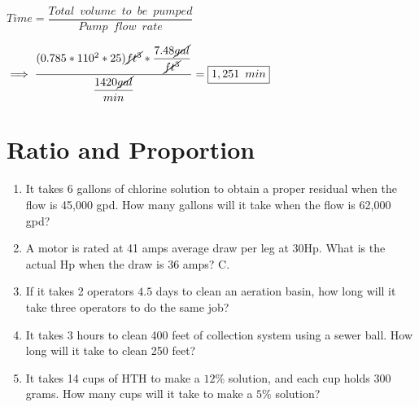 \documentclass{article}
\begin{document}
\vspace{0.3cm}

$Time=\dfrac{Total \enspace volume \enspace to \enspace be \enspace pumped}{Pump \enspace flow \enspace rate}$

\vspace{0.3cm}
$\implies \dfrac{(0.785*110^2*25)\cancel{ft^3}*\dfrac{7.48\cancel{gal}}{\cancel{ft^3}}}{\dfrac{1420\cancel{gal}}{min}}= \boxed{1,251 \enspace min}$\\

\vspace{0.3cm}
\vspace{1cm}
\section{Ratio and Proportion}
\begin{enumerate}
\item It takes 6 gallons of chlorine solution to obtain a proper residual when the flow is 45,000 gpd. How many gallons will it take when the flow is 62,000 gpd?

\item A motor is rated at 41 amps average draw per leg at $30 \mathrm{Hp}$. What is the actual $\mathrm{Hp}$ when the draw is 36 amps? C. 

\item If it takes 2 operators $4.5$ days to clean an aeration basin, how long will it take three operators to do the same job?

\item It takes 3 hours to clean 400 feet of collection system using a sewer ball. How long will it take to clean 250 feet?

\item It takes 14 cups of $\mathrm{HTH}$ to make a $12 \%$ solution, and each cup holds 300 grams. How many cups will it take to make a $5 \%$ solution?
\end{enumerate}
\vspace{1cm}
\end{document}
